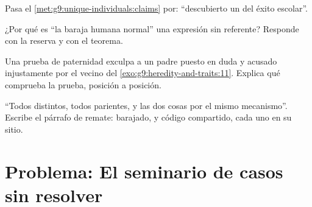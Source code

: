 \begin{exercise}[$\star\star$]\label{exo:g9:unique-individuals:9}
Pasa el \cref{met:g9:unique-individuals:claims} por: ``descubierto un
 del éxito escolar''.
\end{exercise}

\begin{exercise}[$\star\star$]\label{exo:g9:unique-individuals:10}
¿Por qué es ``la baraja humana normal'' una expresión sin referente?
Responde con la reserva y con el teorema.
\end{exercise}

\begin{exercise}[$\star\star$]\label{exo:g9:unique-individuals:11}
Una prueba de paternidad exculpa a un padre puesto en duda y acusado
injustamente por el vecino del \cref{exo:g9:heredity-and-traits:11}.
Explica qué comprueba la prueba, posición a posición.
\end{exercise}

\begin{exercise}[$\star\star\star$]\label{exo:g9:unique-individuals:12}
``Todos distintos, todos parientes, y las dos cosas por el mismo
mecanismo''. Escribe el párrafo de remate: barajado,  y código
compartido, cada uno en su sitio.
\end{exercise}

\section{Problema: El seminario de casos sin resolver}

